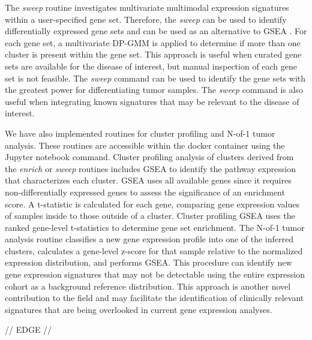 \documentclass[10pt,letterpaper]{article}
\begin{document}
The \textit{sweep} routine investigates multivariate multimodal expression signatures within a user-specified gene set. Therefore, the \textit{sweep} can be used to identify differentially expressed gene sets and can be used as an alternative to GSEA \cite{subramanianGeneSetEnrichment2005}. For each gene set, a multivariate DP-GMM is applied to determine if more than one cluster is present within the gene set. This approach is useful when curated gene sets are available for the disease of interest, but manual inspection of each gene set is not feasible. The \textit{sweep} command can be used to identify the gene sets with the greatest power for differentiating tumor samples. The \textit{sweep} command is also useful when integrating known signatures that may be relevant to the disease of interest.

We have also implemented routines for cluster profiling and N-of-1 tumor analysis. These routines are accessible within the docker container using the Jupyter notebook command. Cluster profiling analysis of clusters derived from the \textit{enrich} or \textit{sweep} routines includes GSEA \cite{korotkevichFastGeneSet2019} to identify the pathway expression that characterizes each cluster. GSEA uses all available genes since it requires non-differentially expressed genes to assess the significance of an enrichment score. A t-statistic is calculated for each gene, comparing gene expression values of samples inside to those outside of a cluster. Cluster profiling GSEA uses the ranked gene-level t-statistics to determine gene set enrichment. The N-of-1 tumor analysis routine classifies a new gene expression profile into one of the inferred clusters, calculates a gene-level z-score for that sample relative to the normalized expression distribution, and performs GSEA. This procedure can identify new gene expression signatures that may not be detectable using the entire expression cohort as a background reference distribution. This approach is another novel contribution to the field and may facilitate the identification of clinically relevant signatures that are being overlooked in current gene expression analyses.

// EDGE //
\end{document}
